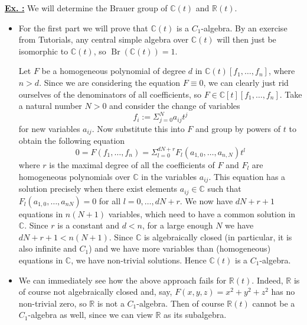 \documentclass[a4paper, 12pt]{article}
\DeclareMathOperator{\Br}{Br}
\newcommand{\R}{\mathbb{R}}
\newcommand{\C}{\mathbb{C}}
\newcounter{excounter}[section]
\newenvironment{Exercise}
    {\refstepcounter{excounter}\underline{\textbf{Ex. \theexcounter:}}}
    {\par\vspace{\baselineskip}}
\begin{document}
\begin{Exercise}
    We will determine the Brauer group of $\C(t)$ and $\R(t)$.
    \begin{itemize}
        \item
            For the first part we will prove that $\C(t)$ is a $C_1$-algebra.
            By an exercise from Tutorials, any central simple algebra over $\C(t)$ will then just be isomorphic to $\C(t)$, so $\Br(\C(t)) = 1$.

            Let $F$ be a homogeneous polynomial of degree $d$ in $\C(t)[f_1,\dots,f_n]$, where $n > d$.
            Since we are considering the equation $F \equiv 0$, we can clearly just rid ourselves of the denominators of all coefficients, so $F \in \C[t][f_1,\dots, f_n]$.
            Take a natural number $N > 0$ and consider the change of variables
            \[
                f_i := \Sigma_{j=0}^{N}a_{ij}t^j
            \]
            for new variables $a_{ij}$. Now substitute this into $F$ and group by powers of $t$ to obtain the following equation
            \[
                0 = F(f_1, \dots, f_n) = \Sigma_{l=0}^{dN+r} F_l(a_{1,0}, \dots, a_{n, N}) t^l
            \]
            where $r$ is the maximal degree of all the coefficients of $F$ and $F_l$ are homogeneous polynomials over $\C$ in the variables $a_{ij}$.
            This equation has a solution precisely when there exist elements $a_{ij} \in \C$ such that $F_l(a_{1,0}, \dots, a_{nN}) = 0$ for all $l = 0, \dots, dN+r$.
            We now have $dN + r + 1$ equations in $n(N+1)$ variables, which need to have a common solution in $\C$.
            Since $r$ is a constant and $d < n$, for a large enough $N$ we have $dN + r + 1 < n(N+1)$.
            Since $\C$ is algebraically closed (in particular, it is also infinite and $C_1$) and we have more variables than (homogeneous) equations in $\C$, we have non-trivial solutions.
            Hence $\C(t)$ is a $C_1$-algebra.
        \item
            We can immediately see how the above approach fails for $\R(t)$.
            Indeed, $\R$ is of course not algebraically closed and, say, $F(x, y, z) = x^2 + y^2 + z^2$ has no non-trivial zero, so $\R$ is not a $C_1$-algebra.
            Then of course $\R(t)$ cannot be a $C_1$-algebra as well, since we can view $\R$ as its subalgebra.


\end{itemize}
\end{Exercise}
\end{document}
